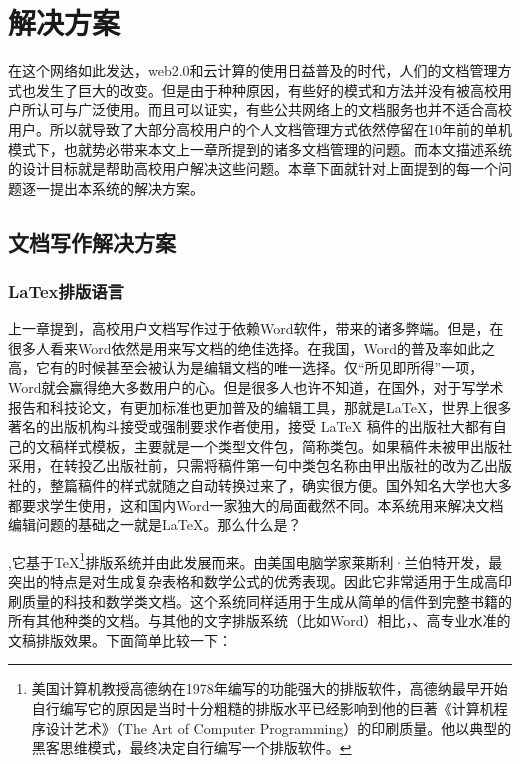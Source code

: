 
\chapter{解决方案}
\label{chap:contribute}

在这个网络如此发达，web2.0和云计算的使用日益普及的时代，人们的文档管理方式也发生了巨大的改变。但是由于种种原因，有些好的模式和方法并没有被高校用户所认可与广泛使用。而且可以证实，有些公共网络上的文档服务也并不适合高校用户。所以就导致了大部分高校用户的个人文档管理方式依然停留在10年前的单机模式下，也就势必带来本文上一章所提到的诸多文档管理的问题。而本文描述系统的设计目标就是帮助高校用户解决这些问题。本章下面就针对上面提到的每一个问题逐一提出本系统的解决方案。

\section{文档写作解决方案}
\label{sec:write}

\subsection{LaTex排版语言}
\label{sec:latex}

上一章提到，高校用户文档写作过于依赖Word软件，带来的诸多弊端。但是，在很多人看来Word依然是用来写文档的绝佳选择。在我国，Word的普及率如此之高，它有的时候甚至会被认为是编辑文档的唯一选择。仅“所见即所得”一项，Word就会赢得绝大多数用户的心。但是很多人也许不知道，在国外，对于写学术报告和科技论文，有更加标准也更加普及的编辑工具，那就是\LaTeX\cite{tex,SHELL02,companion,dzs2001latex2}，世界上很多著名的出版机构斗接受或强制要求作者使用，接受 LaTeX 稿件的出版社大都有自己的文稿样式模板，主要就是一个类型文件包，简称类包。如果稿件未被甲出版社采用，在转投乙出版社前，只需将稿件第一句中类包名称由甲出版社的改为乙出版社的，整篇稿件的样式就随之自动转换过来了，确实很方便。国外知名大学也大多都要求学生使用，这和国内Word一家独大的局面截然不同。本系统用来解决文档编辑问题的基础之一就是\LaTeX。那么什么是？

,它基于\TeX\footnote{美国计算机教授高德纳在1978年编写的功能强大的排版软件，高德纳最早开始自行编写它的原因是当时十分粗糙的排版水平已经影响到他的巨著《计算机程序设计艺术》（The Art of Computer Programming）的印刷质量。他以典型的黑客思维模式，最终决定自行编写一个排版软件。}排版系统并由此发展而来。由美国电脑学家莱斯利·兰伯特开发，最突出的特点是对生成复杂表格和数学公式的优秀表现。因此它非常适用于生成高印刷质量的科技和数学类文档。这个系统同样适用于生成从简单的信件到完整书籍的所有其他种类的文档。与其他的文字排版系统（比如Word）相比，、高专业水准的文稿排版效果。下面简单比较一下：

